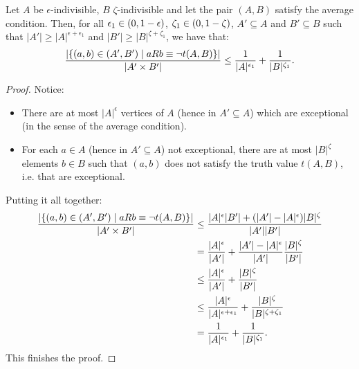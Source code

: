         \begin{lemma} \label{lem:exceptions_bound_of_epsilon_indivisible_sets}
            Let $A$ be $\epsilon$-indivisible, $B$ $\zeta$-indivisible and let the pair $(A,B)$ satisfy the average condition.
            Then, for all $\epsilon_1 \in ( 0, 1-\epsilon )$, $\zeta_1 \in ( 0, 1-\zeta )$, $A' \subseteq A$
                and $B' \subseteq B$ such that $|A'| \geq |A|^{\epsilon + \epsilon_1}$ and $|B'| \geq |B|^{\zeta + \zeta_1}$,
                we have that:
            \[
                \frac{|\{ (a,b) \in (A',B') \mid a R b \equiv \neg t(A,B) \}|}{|A' \times B'|} \leq
                    \frac{1}{|A|^{\epsilon_1}} + \frac{1}{|B|^{\zeta_1}}.
            \]
            \begin{proof}
                Notice:
                \begin{itemize}
                    \item There are at most $|A|^\epsilon$ vertices of $A$ (hence in $A' \subseteq A$) which are exceptional
                        (in the sense of the average condition).
                    \item For each $a \in A$ (hence in $A' \subseteq A$) not exceptional, there are at most $|B|^\zeta$ elements
                        $b \in B$ such that $(a,b)$ does not satisfy the truth value $t(A,B)$, i.e. that are exceptional.
                \end{itemize}
                Putting it all together:
                \[
                    \begin{split}
                        \frac{|\{ (a,b) \in (A',B') \mid a R b \equiv \neg t(A,B) \}|}{|A' \times B'|}
                            &\leq \frac{|A|^\epsilon |B'| + (|A'| - |A|^\epsilon) |B|^\zeta}{|A'| |B'|} \\
                            &= \frac{|A|^\epsilon}{|A'|} + \frac{|A'| - |A|^\epsilon}{|A'|} \frac{|B|^\zeta}{|B'|} \\
                            &\leq \frac{|A|^\epsilon}{|A'|} + \frac{|B|^\zeta}{|B'|} \\
                            &\leq \frac{|A|^\epsilon}{|A|^{\epsilon + \epsilon_1}} + \frac{|B|^\zeta}{|B|^{\zeta + \zeta_1}} \\
                            &= \frac{1}{|A|^{\epsilon_1}} + \frac{1}{|B|^{\zeta_1}}.
                    \end{split}
                \]
                This finishes the proof.
            \end{proof}
        \end{lemma}

